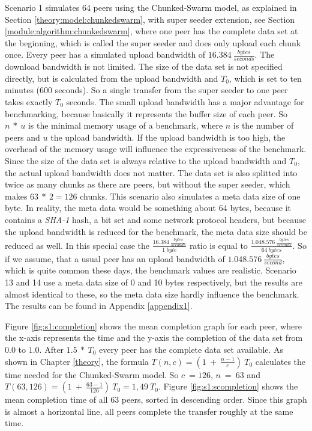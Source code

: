 Scenario 1 simulates 64 peers using the Chunked-Swarm model, as explained in Section \ref{theory:model:chunkedswarm}, with super seeder extension, see Section \ref{module:algorithm:chunkedswarm}, where one peer has the complete data set at the beginning, which is called the super seeder and does only upload each chunk once. Every peer has a simulated upload bandwidth of $16.384\:\frac{bytes}{seconds}$. The download bandwidth is not limited. The size of the data set is not specified directly, but is calculated from the upload bandwidth and $T_0$, which is set to ten minutes (600 seconds). So a single transfer from the super seeder to one peer takes exactly $T_0$ seconds. The small upload bandwidth has a major advantage for benchmarking, because basically it represents the buffer size of each peer. So $n\:*\:u$ is the minimal memory usage of a benchmark, where $n$ is the number of peers and $u$ the upload bandwidth. If the upload bandwidth is too high, the overhead of the memory usage will influence the expressiveness of the benchmark. Since the size of the data set is always relative to the upload bandwidth and $T_0$, the actual upload bandwidth does not matter. The data set is also splitted into twice as many chunks as there are peers, but without the super seeder, which makes $63\:*\:2=126$ chunks. This scenario also simulates a meta data size of one byte. In reality, the meta data would be something about 64 bytes, because it contains a \emph{SHA-1} hash, a bit set and some network protocol headers, but because the upload bandwidth is reduced for the benchmark, the meta data size should be reduced as well. In this special case the $\frac{16.384\:\frac{bytes}{seconds}}{1\:byte}$ ratio is equal to $\frac{1.048.576\:\frac{bytes}{seconds}}{64\:bytes}$. So if we assume, that a usual peer has an upload bandwidth of $1.048.576\:\frac{bytes}{second}$, which is quite common these days, the benchmark values are realistic. Scenario 13 and 14 use a meta data size of 0 and 10 bytes respectively, but the results are almost identical to these, so the meta data size hardly influence the benchmark. The results can be found in Appendix \ref{appendix1}.

Figure \ref{fig:s1:completion} shows the mean completion graph for each peer, where the x-axis represents the time and the y-axis the completion of the data set from $0.0$ to $1.0$. After $1.5\:*\:T_0$ every peer has the complete data set available. As shown in Chapter \ref{theory}, the formula $T(n, c) = (1\:+\:\frac{n-1}{c})\:T_0$ calculates the time needed for the Chunked-Swarm model. So $c\:=126$, $n\:=\:63$ and $T(63, 126) = (1\:+\:\frac{63-1}{126})\:T_0 = 1,49\:T_0$. Figure \ref{fig:s1:scompletion} shows the mean completion time of all 63 peers, sorted in descending order. Since this graph is almost a horizontal line, all peers complete the transfer roughly at the same time.


